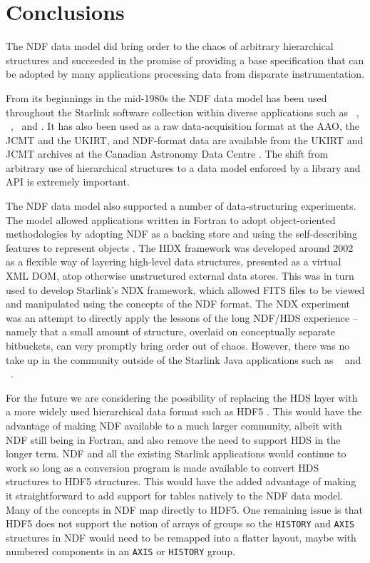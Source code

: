 \documentclass[final,authoryear,5p,times,twocolumn]{elsarticle}
\begin{document}
\section{Conclusions}
\label{sec:conclusion}

The NDF data model did bring order to the chaos of arbitrary
hierarchical structures and succeeded in the
promise of providing a base specification that can be adopted by many
applications processing data from disparate instrumentation.

From its beginnings in the mid-1980s the NDF data model has been used
throughout the Starlink software collection within diverse
applications such as \smurf\ \citep{2013MNRAS.430.2545C},
\ccdpack\ \citep[][]{1993ESOC...47...39W,SUN139}, \gaia\ and \KAPPA.
It has also been used as a raw data-acquisition format at the
AAO, the JCMT and the UKIRT, and NDF-format data are available from
the UKIRT and JCMT archives at the Canadian Astronomy Data Centre
\citep{2008ASPC..394..450E,P01_adassxxiii,2014Economou}. The shift from arbitrary
use of hierarchical structures to a data model enforced by a library
and API is extremely important.

The NDF data model also supported a number of data-structuring
experiments.
The model allowed applications written in Fortran to
adopt object-oriented methodologies by adopting NDF as a backing store
and using the self-describing features to represent objects
\citep{1993ASPC...52..199B}.
The HDX framework \citep{2003ASPC..295..221G} was developed around 2002 as a flexible
way of layering high-level data structures, presented as a virtual XML
DOM, atop otherwise unstructured external data stores.  This was in
turn used to develop Starlink's NDX framework,\label{sec:ndx} which allowed FITS
files to be viewed and manipulated using the concepts of the NDF
format.  The NDX experiment was an attempt to directly apply the
lessons of the long NDF/HDS experience -- namely that a small amount of
structure, overlaid on conceptually separate bitbuckets, can very
promptly bring order out of chaos.
However, there was no take up in the community outside of the Starlink Java applications
such as \treeview\ \citep{2003ASPC..295..445B} and
\splat\ \citep[][]{2005ASPC..347...22D,2014Skoda}.

For the future we are considering the possibility of replacing the HDS
layer with a more widely used hierarchical data format such as HDF5
\citep{Folk:2011:OHT:1966895.1966900}. This would have the advantage
of making NDF available to a much larger community, albeit with NDF
still being in Fortran, and also remove the
need to support HDS in the longer term. NDF and all the existing
Starlink applications would continue to work so long as a conversion
program is made available to convert HDS structures to HDF5 structures.
This would have the added advantage of making it straightforward to
add support for tables natively to the NDF data model. Many of the
concepts in NDF map directly to HDF5. One remaining issue is that HDF5
does not support the notion of arrays of groups so the
\texttt{HISTORY} and \texttt{AXIS} structures in NDF would need to be
remapped into a flatter layout, maybe with numbered components in an
\texttt{AXIS} or \texttt{HISTORY} group.
\end{document}
